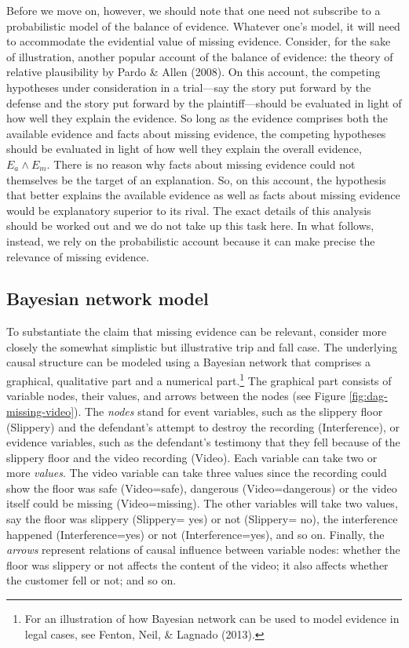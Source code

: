 \documentclass[
  10pt,
  dvipsnames,enabledeprecatedfontcommands]{scrartcl}
\begin{document}
Before we move on, however, we should note that one need not subscribe
to a probabilistic model of the balance of evidence. Whatever one's
model, it will need to accommodate the evidential value of missing
evidence. Consider, for the sake of illustration, another popular
account of the balance of evidence: the theory of relative plausibility
by Pardo \& Allen (2008). On this account, the competing hypotheses
under consideration in a trial---say the story put forward by the
defense and the story put forward by the plaintiff---should be evaluated
in light of how well they explain the evidence. So long as the evidence
comprises both the available evidence and facts about missing evidence,
the competing hypotheses should be evaluated in light of how well they
explain the overall evidence, \(E_a\wedge E_m\). There is no reason why
facts about missing evidence could not themselves be the target of an
explanation. So, on this account, the hypothesis that better explains
the available evidence as well as facts about missing evidence would be
explanatory superior to its rival. The exact details of this analysis
should be worked out and we do not take up this task here. In what
follows, instead, we rely on the probabilistic account because it can
make precise the relevance of missing evidence.

\hypertarget{bayesian-network-model}{%
\subsection{Bayesian network model}\label{bayesian-network-model}}

To substantiate the claim that missing evidence can be relevant,
consider more closely the somewhat simplistic but illustrative trip and
fall case. The underlying causal structure can be modeled using a
Bayesian network that comprises a graphical, qualitative part and a
numerical part.\footnote{For an illustration of how Bayesian network can
  be used to model evidence in legal cases, see Fenton, Neil, \& Lagnado
  (2013).} The graphical part consists of variable nodes, their values,
and arrows between the nodes (see Figure \ref{fig:dag-missing-video}).
The \textit{nodes} stand for event variables, such as the slippery floor
(\textsf{Slippery}) and the defendant's attempt to destroy the recording
(\textsf{Interference}), or evidence variables, such as the defendant's
testimony that they fell because of the slippery floor and the video
recording (\textsf{Video}). Each variable can take two or more
\textit{values}. The video variable can take three values since the
recording could show the floor was safe (\textsf{Video}=\textsf{safe}),
dangerous (\textsf{Video}=\textsf{dangerous}) or the video itself could
be missing (\textsf{Video}=\textsf{missing}). The other variables will
take two values, say the floor was slippery (\textsf{Slippery}=
\textsf{yes}) or not (\textsf{Slippery}= \textsf{no}), the interference
happened (\textsf{Interference}=\textsf{yes}) or not
(\textsf{Interference}=\textsf{yes}), and so on. Finally, the
\textit{arrows} represent relations of causal influence between variable
nodes: whether the floor was slippery or not affects the content of the
video; it also affects whether the customer fell or not; and so on.
\end{document}

